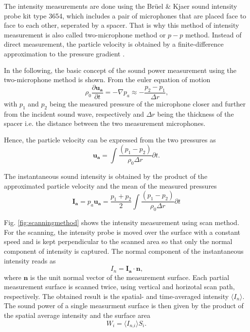 The intensity measurements are done using the Brüel \& Kjaer sound intensity probe kit type 3654, which includes a pair of microphones that are placed face
to face to each other, seperated by a spacer. That is why this method of intensity measurement is also called two-microphone method or $p-p$ method. Instead of
direct measurement, the particle velocity is obtained by a finite-difference approximation to the pressure gradient \cite{jocobsen_2005}\cite{moschioni_2008}.

In the following, the basic concept of the sound power measurement using the two-microphone method is shown. From the euler equation of motion
\begin{equation}
    \rho_0 \frac{\partial \boldsymbol{u_a}}{\partial t} = -\nabla p_a \approx -\frac{p_2 - p_1}{\Delta r}\text{,}
\end{equation}
with $p_1$ and $p_2$ being the measured pressure of the microphone closer and further from the incident sound wave, respectively and $\Delta r$ being the thickness of the spacer i.e. the distance between the two measurement microphones.

Hence, the particle velocity can be expressed from the two pressures as
\begin{equation}
    \boldsymbol{u_a} = \int\frac{(p_1 - p_2)}{\rho_0 \Delta r}\partial t \text{.}
\end{equation}

The instantaneous sound intensity is obtained by the product of the approximated particle velocity and the mean of the measured pressures
\begin{equation}
    \boldsymbol{I_a} = p_a\boldsymbol{u_a} = \frac{p_1 + p_2}{2} \int\frac{(p_1 - p_2)}{\rho_0 \Delta r}\partial t
\end{equation}

Fig. \ref{fig:scanningmethod} shows the intensity measurement using scan method. For the scanning, the intensity probe is moved over the surface with a constant speed and is kept perpendicular to the scanned area so that only the normal component of intensity is captured. The normal component of the instantaneous intensity reads as
\begin{equation}
    I_n = \boldsymbol{I_a} \cdot \boldsymbol{n}\text{,}
\end{equation}
where $\boldsymbol{n}$ is the unit normal vector of the measurement surface. Each partial measurement surface is scanned twice, using vertical and horizotal scan path, respectively. The obtained result is the spatial- and time-averaged intensity $\langle I_{n}\rangle$. The sound power of a single measurment surface is then given by the product of the spatial average intensity and the surface area
\begin{equation}
    W_i = \langle I_{n\text{,}i}\rangle S_i\text{.}
\end{equation}


